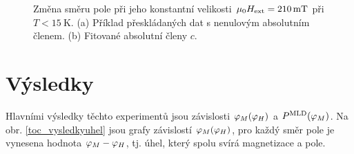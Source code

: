 \begin{figure}[htbp]\centering
{}
	\caption{Změna směru pole při jeho konstantní velikosti $\mu_0 H_\text{ext}=\SI{210}{\milli\tesla}$ při $T<\SI{15}{\kelvin}$. (a) Příklad přeskládaných dat s nenulovým absolutním členem. (b) Fitované absolutní členy $c$.}\label{toc_preskladane}
\end{figure}

\section{Výsledky}

Hlavními výsledky těchto experimentů jsou závislosti $\varphi_M(\varphi_H)$ a $P^{\text{MLD}}(\varphi_M)$.
Na obr. \ref{toc_vysledkyuhel} jsou grafy závislostí $\varphi_M(\varphi_H)$, pro každý směr pole je vynesena hodnota $\varphi_M-\varphi_H$, tj. úhel, který spolu svírá magnetizace a pole.

